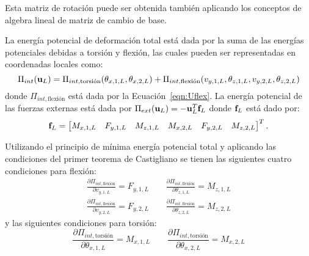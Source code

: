 Esta matriz de rotación puede ser obtenida también aplicando los conceptos de algebra lineal de matriz de cambio de base.

La energía potencial de deformación total está dada por la suma de las energías potenciales debidas a torsión y flexión, las cuales pueden ser representadas en coordenadas locales como:
%
\begin{equation}
\Pi_{int} ({\bf u}_L ) = \Pi_{int,\text{torsión}}(\theta_{x,1,L},\theta_{x,2,L}) + \Pi_{int,\text{flexión}}(v_{y,1,L}, \theta_{z,1,L},v_{y,2,L},\theta_{z,2,L})
\end{equation}
%
donde $\Pi_{int,\text{flexión}}$ está dada por la Ecuación~\eqref{eqn:Uflex}. %
%
La energía potencial de las fuerzas externas está dada por $\Pi_{ext} ({\bf u}_L) = -{\bf u}_L^T {\bf f}_L$ donde ${\bf f}_L$ está dado por:
\begin{equation}
{\bf f}_L = 
\left[
\begin{matrix}
	M_{x,1,L} & F_{y,1,L} & M_{z,1,L} & M_{x,2,L} & F_{y,2,L} & M_{z,2,L}
\end{matrix}
\right]^T.
\end{equation}


Utilizando el principio de mínima energía potencial total y aplicando las condiciones del primer teorema de Castigliano se tienen las siguientes cuatro condiciones para flexión:
\begin{eqnarray}
\frac{\partial \Pi_{int,\text{flexión}}}{\partial v_{y,1,L}} =  F_{y,1,L}  \qquad \frac{\partial \Pi_{int,\text{flexión}}}{\partial \theta_{z,1,L}} =  M_{z,1,L} \\
\frac{\partial \Pi_{int,\text{flexión}}}{\partial v_{y,2,L}} =  F_{y,2,L} \qquad \frac{\partial \Pi_{int,\text{flexión}}}{\partial \theta_{z,2,L}} =  M_{z,2,L}
\end{eqnarray}
y las siguientes condiciones para torsión:
%
\begin{equation}
\frac{\partial \Pi_{int,\text{torsión}}}{\partial \theta_{x,1,L}} =  M_{x,1,L} \qquad 
\frac{\partial \Pi_{int,\text{torsión}}}{\partial \theta_{x,2,L}} =  M_{x,2,L}
\end{equation}

